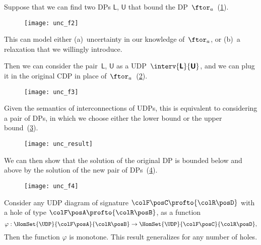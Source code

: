 Suppose that we can find two DPs $\boldsymbol{\mathsf{L}}$, $\boldsymbol{\mathsf{U}}$ that bound the DP~$\ftor_{a}$~(\cref{fig:consider2}).

\begin{figure}[h!]
    \texttt{[image: unc\_f2]}
    \caption{}
    \label{fig:consider2}
\end{figure}

This can model either (a)~uncertainty in our knowledge
of~$\ftor_{a}$, or (b)~a relaxation that we willingly introduce.

Then we can consider the pair~$\boldsymbol{\mathsf{L}}$,
$\boldsymbol{\mathsf{U}}$ as a UDP~$\interv {\boldsymbol{\mathsf{L}}} {\boldsymbol{\mathsf{U}}}$,
and we can plug it in the original CDP in place of~$\ftor_{a}$~(\cref{fig:luinside}).

\begin{figure}[h!]
    \texttt{[image: unc\_f3]}
    \caption{}
    \label{fig:luinside}
\end{figure}

Given the semantics of interconnections of UDPs, this is equivalent to considering a pair of DPs, in which we choose either the lower bound or the upper bound~(\cref{fig:pair}).

\begin{figure}[h!]
    \texttt{[image: unc\_result]}
    \caption{}
    \label{fig:pair}
\end{figure}

We can then show that the solution of the original DP is bounded below and above by the solution of the new pair of DPs~(\cref{fig:domin}).

\begin{figure}[h!]
    \texttt{[image: unc\_f4]}
    \caption{}
    \label{fig:domin}
\end{figure}

\begin{proposition}
    Consider any UDP diagram of signature ${\colF\posC }\profto {\colR\posD}$ with a hole
    of type  ${\colF\posA} \profto {\colR\posB}$, as a function
    \begin{equation}
        \varphi: \HomSet{\UDP}{\colF\posA}{\colR\posB} \to  \HomSet{\UDP}{\colF\posC}{\colR\posD},
    \end{equation}
    Then the function $\varphi$ is monotone.
    This result generalizes for any number of holes.
\end{proposition}

